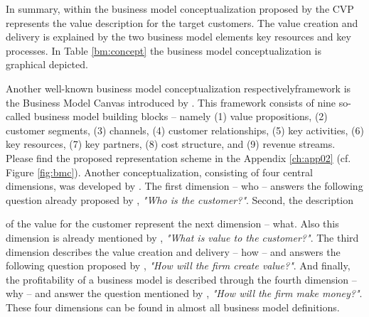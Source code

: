 In summary, within the business model conceptualization proposed by \citet[p. 54]{Johnson2008} the \ac{CVP} represents the value description for the target customers. The value creation and delivery is explained by the two business model elements key resources and key processes. In Table \ref{bm:concept} the business model conceptualization is graphical depicted.

Another well-known business model conceptualization respectively\linebreak framework is the Business Model Canvas  introduced by \citet{Osterwalder2010}. This framework consists of nine so-called business model building blocks -- namely (1) value propositions, (2) customer segments, (3) channels, (4) customer relationships, (5) key activities, (6) key resources, (7) key partners, (8) cost structure, and (9) revenue streams. Please find the proposed representation scheme in the Appendix \ref{ch:app02} (cf. Figure \ref{fig:bmc}). Another conceptualization, consisting of four central dimensions, was developed by \citet{Frankenberger2013}. The first dimension -- who -- answers the following question already proposed by \citet[pp. 49-61]{Drucker1954}, \textit{"Who is the customer?"}. Second, the description\linebreak 
\vspace*{-\baselineskip}
 
\noindent of the value for the customer represent the next dimension -- what. Also this dimension is already mentioned by \citet[pp. 49-61]{Drucker1954}, \textit{"What is value to the customer?"}. The third dimension describes the value creation and delivery -- how -- and answers the following question proposed by \citet[pp. 729-732]{Morris2005}, \textit{"How will the firm create value?"}. And finally, the profitability of a business model is described through the fourth dimension -- why -- and answer the question mentioned by \citet[pp. 729-732]{Morris2005}, \textit{"How will the firm make money?"}. These four dimensions can be found in almost all business model definitions.

